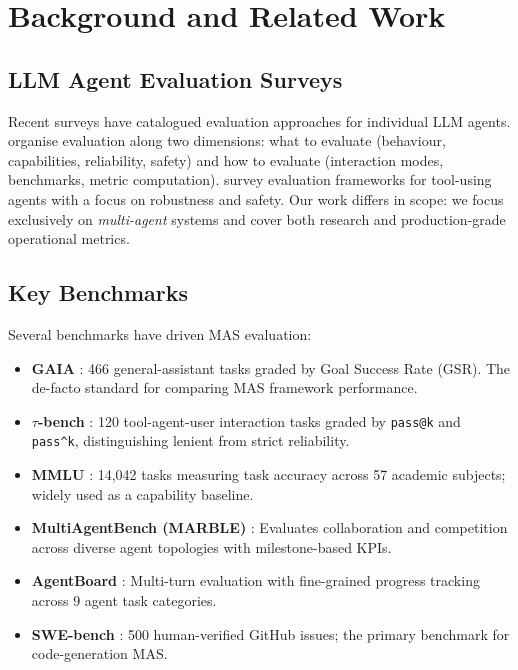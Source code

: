 \documentclass[11pt,a4paper]{article}
\newcommand{\abbr}[1]{\texttt{#1}}
\begin{document}
\section{Background and Related Work}
\label{sec:background}

\subsection{LLM Agent Evaluation Surveys}

Recent surveys have catalogued evaluation approaches for individual LLM agents.
\citet{llm_eval_survey2025} organise evaluation along two dimensions: what to evaluate
(behaviour, capabilities, reliability, safety) and how to evaluate (interaction modes,
benchmarks, metric computation). \citet{agent_eval_survey2025} survey evaluation
frameworks for tool-using agents with a focus on robustness and safety. Our work
differs in scope: we focus exclusively on \emph{multi-agent} systems and cover both
research and production-grade operational metrics.

\subsection{Key Benchmarks}

Several benchmarks have driven MAS evaluation:

\begin{itemize}
  \item \textbf{GAIA} \citep{gaia2023}: 466 general-assistant tasks graded by Goal
    Success Rate (GSR). The de-facto standard for comparing MAS framework performance.
  \item \textbf{$\tau$-bench} \citep{tbench2024}: 120 tool-agent-user interaction tasks
    graded by \abbr{pass@k} and \abbr{pass\^{}k}, distinguishing lenient from strict
    reliability.
  \item \textbf{MMLU} \citep{mmlu2020}: 14,042 tasks measuring task accuracy across
    57 academic subjects; widely used as a capability baseline.
  \item \textbf{MultiAgentBench (MARBLE)} \citep{marble2025}: Evaluates collaboration
    and competition across diverse agent topologies with milestone-based KPIs.
  \item \textbf{AgentBoard} \citep{agentboard2024}: Multi-turn evaluation with
    fine-grained progress tracking across 9 agent task categories.
  \item \textbf{SWE-bench} \citep{swe_bench2024}: 500 human-verified GitHub issues;
    the primary benchmark for code-generation MAS.
\end{itemize}
\end{document}
